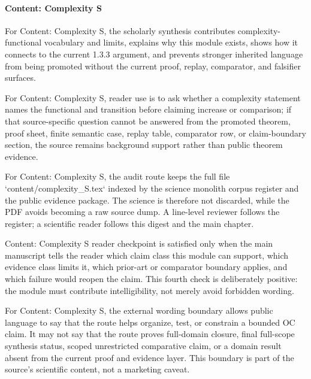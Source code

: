 \paragraph{Content: Complexity S}

For Content: Complexity S, the scholarly synthesis contributes complexity-functional vocabulary and limits, explains why this module exists, shows how it connects to the current 1.3.3 argument, and prevents stronger inherited language from being promoted without the current proof, replay, comparator, and falsifier surfaces.


For Content: Complexity S, reader use is to ask whether a complexity statement names the functional and transition before claiming increase or comparison; if that source-specific question cannot be answered from the promoted theorem, proof sheet, finite semantic case, replay table, comparator row, or claim-boundary section, the source remains background support rather than public theorem evidence.


For Content: Complexity S, the audit route keeps the full file `content/complexity\_S.tex` indexed by the science monolith corpus register and the public evidence package. The science is therefore not discarded, while the PDF avoids becoming a raw source dump. A line-level reviewer follows the register; a scientific reader follows this digest and the main chapter.


Content: Complexity S reader checkpoint is satisfied only when the main manuscript tells the reader which claim class this module can support, which evidence class limits it, which prior-art or comparator boundary applies, and which failure would reopen the claim. This fourth check is deliberately positive: the module must contribute intelligibility, not merely avoid forbidden wording.


For Content: Complexity S, the external wording boundary allows public language to say that the route helps organize, test, or constrain a bounded OC claim. It may not say that the route proves full-domain closure, final full-scope synthesis status, scoped unrestricted comparative claim, or a domain result absent from the current proof and evidence layer. This boundary is part of the source's scientific content, not a marketing caveat.
